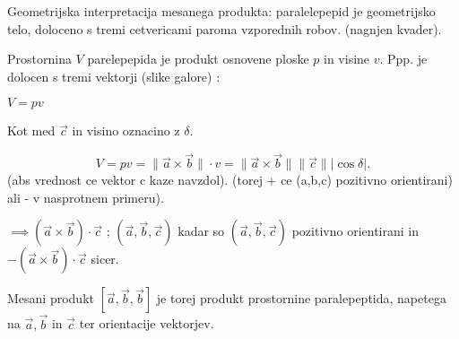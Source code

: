\documentclass{report}
\begin{document}
Geometrijska interpretacija mesanega produkta: paralelepepid je geometrijsko telo, doloceno s tremi cetvericami paroma vzporednih robov. (nagnjen kvader).


Prostornina $V$ parelepepida je produkt osnovene ploske $p$ in visine $v$. Ppp. je dolocen s tremi vektorji (slike galore) :

 $V = p v$


Kot med $\vec{c}$ in visino oznacino z $\delta$.

 \[
V = p v = \|\vec{a} \times \vec{b}\| \cdot v = \|\vec{a} \times \vec{b}\| \|\vec{c}\| |\cos \delta|
.\]
(abs vrednost ce vektor c kaze navzdol).
(torej + ce (a,b,c) pozitivno orientirani) ali - v nasprotnem primeru).

$ \implies (\vec{a} \times \vec{b}) \cdot \vec{c} \text{  ; } \left( \vec{a}, \vec{b}, \vec{c} \right) $ kadar so $\left( \vec{a},\vec{b},\vec{c} \right) $ pozitivno orientirani in $- \left( \vec{a} \times \vec{b} \right) \cdot \vec{c}$ sicer.


Mesani produkt $\left[ \vec{a},\vec{b},\vec{b}  \right] $ je torej produkt prostornine paralepeptida, napetega na $\vec{a},\vec{b}$ in $\vec{c}$ ter orientacije vektorjev.



\cor{}{

\[
	\left[ (x_1,y_1,z_1), (x_2,y_2,z_2), (x_3,y_3,z_3) \right]=
	\begin{vmatrix}
		x_1 & y_1 & z_1 \\
		x_2 & y_2 & z_2 \\
		x_3 & y_3 & z_3

	\end{vmatrix}
.\]
}

\end{document}
